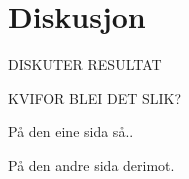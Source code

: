 \section{Diskusjon}
DISKUTER RESULTAT

KVIFOR BLEI DET SLIK?



På den eine sida så..

På den andre sida derimot.
